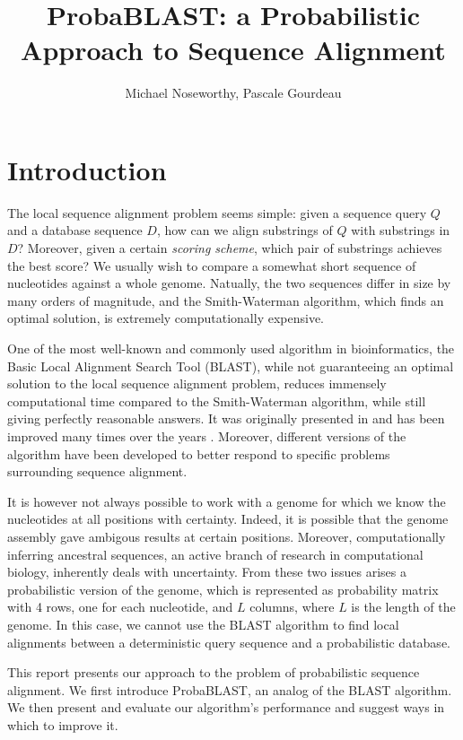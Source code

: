 \documentclass[10pt]{IEEEtran}
\begin{document}
\title{ProbaBLAST: a Probabilistic Approach to Sequence Alignment}
\author{Michael Noseworthy, Pascale Gourdeau}
\date{}
\maketitle

\section{Introduction}

The local sequence alignment problem seems simple: given a sequence query $Q$ and a database sequence $D$, how can we align substrings of $Q$ with substrings in $D$? Moreover, given a certain \emph{scoring scheme}, which pair of substrings achieves the best score? We usually wish to compare a somewhat short sequence of nucleotides against a whole genome. Natually, the two sequences differ in size by many orders of magnitude, and the Smith-Waterman algorithm, which finds an optimal solution, is extremely computationally expensive. 

One of the most well-known and commonly used algorithm in bioinformatics, the Basic Local Alignment Search Tool (BLAST), while not guaranteeing an optimal solution to the local sequence alignment problem, reduces immensely computational time compared to the Smith-Waterman algorithm, while still giving perfectly reasonable answers. It was originally presented in \cite{originalBLAST} and has been improved many times over the years \cite{blast2}. Moreover, different versions of the algorithm have been developed to better respond to specific problems surrounding sequence alignment. 

It is however not always possible to work with a genome for which we know the nucleotides at all positions with certainty. Indeed, it is possible that the genome assembly gave ambigous results at certain positions. Moreover, computationally inferring ancestral sequences, an active branch of research in computational biology, inherently deals with uncertainty. From these two issues arises a probabilistic version of the genome, which is represented as probability matrix with 4 rows, one for each nucleotide, and $L$ columns, where $L$ is the length of the genome. In this case, we cannot use the BLAST algorithm to find local alignments between a deterministic query sequence and a probabilistic database.

This report presents our approach to the problem of probabilistic sequence alignment. 
We first introduce ProbaBLAST, an analog of the BLAST algorithm. We then present and evaluate our algorithm's performance and suggest ways in which to improve it.
\end{document}
